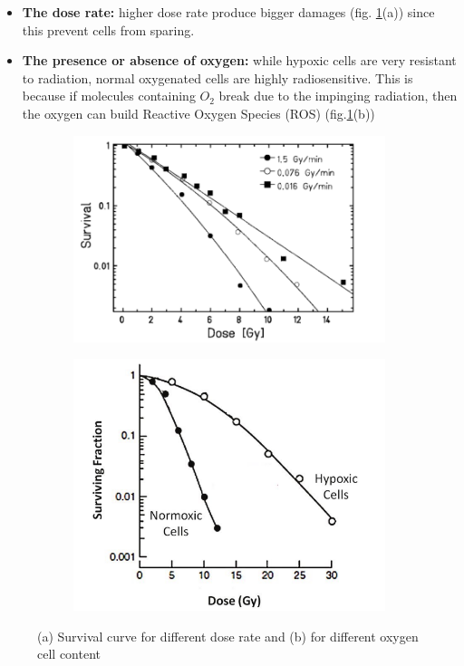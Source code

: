         \begin{itemize}
            \item \textbf{The dose rate:} 
            higher dose rate produce bigger damages (fig. \ref{fig:damage_vs_dose}(a)) since this prevent cells from sparing.
            \item \textbf{The presence or absence of oxygen:} 
            while hypoxic cells are very resistant to
            radiation, normal oxygenated cells are highly radiosensitive. 
            This is because if molecules containing $O_2$ break due to the impinging radiation, then the oxygen can build Reactive Oxygen Species (ROS) (fig.\ref{fig:damage_vs_dose}(b))
        \end{itemize}    
        \begin{figure}[h!]
            \begin{subfigure}{.5\textwidth}
            \centering
            \includegraphics[width=.98\linewidth]{figures/pixel_detectors_usage/survival_curve.png}
            \end{subfigure}
            \begin{subfigure}{.5\textwidth}
                \centering
                \includegraphics[width=.80\linewidth]{figures/pixel_detectors_usage/survival_curve_oxygen.png}
            \end{subfigure}
            \caption{(a) Survival curve for different dose rate and (b) for different oxygen cell content}
            \label{fig:damage_vs_dose}
        \end{figure}

